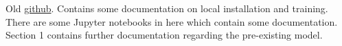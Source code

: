\documentclass{article}
\begin{document}

\begin{spacing}{1.0}

Old \href{https://github.com/exatrkx/NuGraph/tree/main}{\color{blue} github}. Contains some documentation on local installation and training. There are some Jupyter notebooks in here which contain some documentation.\\[0.20cm]

Section 1 contains further documentation regarding the pre-existing model.







% 


\end{spacing}
\end{document}
